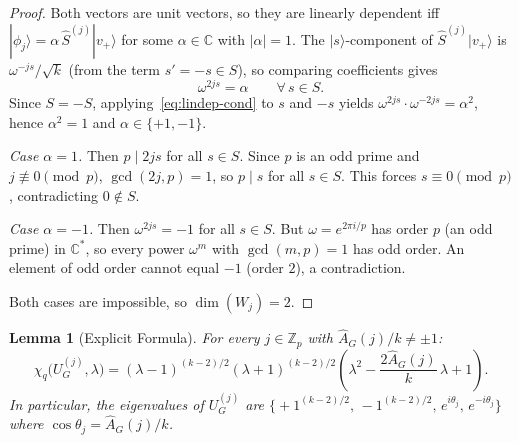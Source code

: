 \documentclass[12pt]{article}
\newtheorem{lemma}[theorem]{Lemma}
\newcommand{\Z}{\mathbb{Z}}
\newcommand{\C}{\mathbb{C}}
\newcommand{\ket}[1]{|#1\rangle}
\newcommand{\Uj}{U_G^{(j)}}
\newcommand{\Shat}{\hat{S}^{(j)}}
\newcommand{\Ahat}{\widehat{A}_G}
\newcommand{\vplus}{v_+}
\newcommand{\phij}{\phi_j}
\begin{document}
\begin{proof}
  Both vectors are unit vectors, so they are linearly dependent iff
  $\ket{\phij} = \alpha\,\Shat\ket{\vplus}$ for some $\alpha \in \C$ with
  $|\alpha|=1$.  The $\ket{s}$-component of $\Shat\ket{\vplus}$ is
  $\omega^{-js}/\sqrt{k}$ (from the term $s'=-s \in S$), so comparing
  coefficients gives
  \begin{equation}\label{eq:lindep-cond}
    \omega^{2js} = \alpha \qquad \forall\, s \in S.
  \end{equation}
  Since $S=-S$, applying~\eqref{eq:lindep-cond} to $s$ and $-s$ yields
  $\omega^{2js}\cdot\omega^{-2js}=\alpha^2$, hence $\alpha^2=1$ and
  $\alpha\in\{+1,-1\}$.

  \medskip
  \noindent\textit{Case $\alpha=1$.}
  Then $p \mid 2js$ for all $s\in S$.  Since $p$ is an odd prime and
  $j\not\equiv 0\pmod{p}$, $\gcd(2j,p)=1$, so $p\mid s$ for all $s\in S$.
  This forces $s\equiv 0\pmod{p}$, contradicting $0\notin S$.

  \medskip
  \noindent\textit{Case $\alpha=-1$.}
  Then $\omega^{2js}=-1$ for all $s\in S$.  But $\omega=e^{2\pi i/p}$ has
  order $p$ (an odd prime) in $\C^*$, so every power $\omega^m$ with
  $\gcd(m,p)=1$ has odd order.  An element of odd order cannot equal $-1$
  (order $2$), a contradiction.

  \medskip
  Both cases are impossible, so $\dim(W_j)=2$.
\end{proof}

\begin{lemma}[Explicit Formula]\label{lem:formula}
  For every $j \in \Z_p$ with $\Ahat(j)/k \neq \pm 1$:
  \begin{equation}\label{eq:chi-block}
    \chi_q\!\bigl(\Uj, \lambda\bigr)
    = (\lambda - 1)^{(k-2)/2}(\lambda + 1)^{(k-2)/2}
      \!\left(\lambda^2 - \frac{2\Ahat(j)}{k}\,\lambda + 1\right).
  \end{equation}
  In particular, the eigenvalues of $\Uj$ are
  $\bigl\{+1^{(k-2)/2},\,-1^{(k-2)/2},\,e^{i\theta_j},\,e^{-i\theta_j}\bigr\}$
  where $\cos\theta_j = \Ahat(j)/k$.
\end{lemma}
\end{document}

